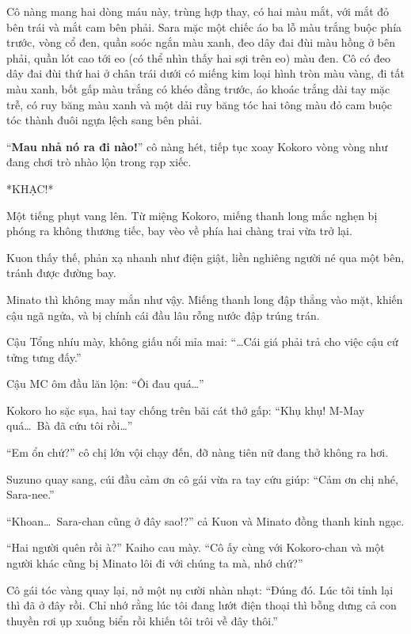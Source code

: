 \documentclass[../main.tex]{subfiles}
\begin{document}
Cô nàng mang hai dòng máu này, trùng hợp thay, có hai màu mắt, với mắt đỏ bên trái và mắt cam bên phải. Sara mặc một chiếc áo ba lỗ màu trắng buộc phía trước, vòng cổ đen, quần soóc ngắn màu xanh, đeo dây đai đùi màu hồng ở bên phải, quần lót cao tới eo (có thể nhìn thấy hai sợi trên eo) màu đen. Cô có đeo dây đai đùi thứ hai ở chân trái dưới có miếng kim loại hình tròn màu vàng, đi tất màu xanh, bốt gấp màu trắng có khéo đằng trước, áo khoác trắng dài tay mặc trễ, có ruy băng màu xanh và một dải ruy băng tóc hai tông màu đỏ cam buộc tóc thành đuôi ngựa lệch sang bên phải.

\chrint

``\textbf{Mau nhả nó ra đi nào!}'' cô nàng hét, tiếp tục xoay Kokoro vòng vòng như đang chơi trò nhào lộn trong rạp xiếc.

*KHẠC!*

Một tiếng phụt vang lên. Từ miệng Kokoro, miếng thanh long mắc nghẹn bị phóng ra không thương tiếc, bay vèo về phía hai chàng trai vừa trở lại.

Kuon thấy thế, phản xạ nhanh như điện giật, liền nghiêng người né qua một bên, tránh được đường bay.

Minato thì không may mắn như vậy. Miếng thanh long đập thẳng vào mặt, khiến cậu ngã ngửa, và bị chính cái đầu lâu rỗng nước đập trúng trán.


Cậu Tổng nhíu mày, không giấu nổi mỉa mai: ``\dots Cái giá phải trả cho việc cậu cứ tửng tưng đấy.''

Cậu MC ôm đầu lăn lộn: ``Ôi đau quá\dots''

Kokoro ho sặc sụa, hai tay chống trên bãi cát thở gấp: ``Khụ khụ! M-May quá\dots\ Bà đã cứu tôi rồi\dots''

``Em ổn chứ?'' cô chị lớn vội chạy đến, đỡ nàng tiên nữ đang thở không ra hơi.

Suzuno quay sang, cúi đầu cảm ơn cô gái vừa ra tay cứu giúp: ``Cảm ơn chị nhé, Sara-nee.''

``Khoan\dots\ Sara-chan cũng ở đây sao!?'' cả Kuon và Minato đồng thanh kinh ngạc.

``Hai người quên rồi à?'' Kaiho cau mày. ``Cô ấy cùng với Kokoro-chan và một người khác cũng bị Minato lôi đi với chúng ta mà, nhớ chứ?''

Cô gái tóc vàng quay lại, nở một nụ cười nhàn nhạt: ``Đúng đó. Lúc tôi tỉnh lại thì đã ở đây rồi. Chỉ nhớ rằng lúc tôi đang lướt điện thoại thì bỗng dưng cả con thuyền rơi ụp xuống biển rồi khiến tôi trôi về đây thôi.''
\end{document}
